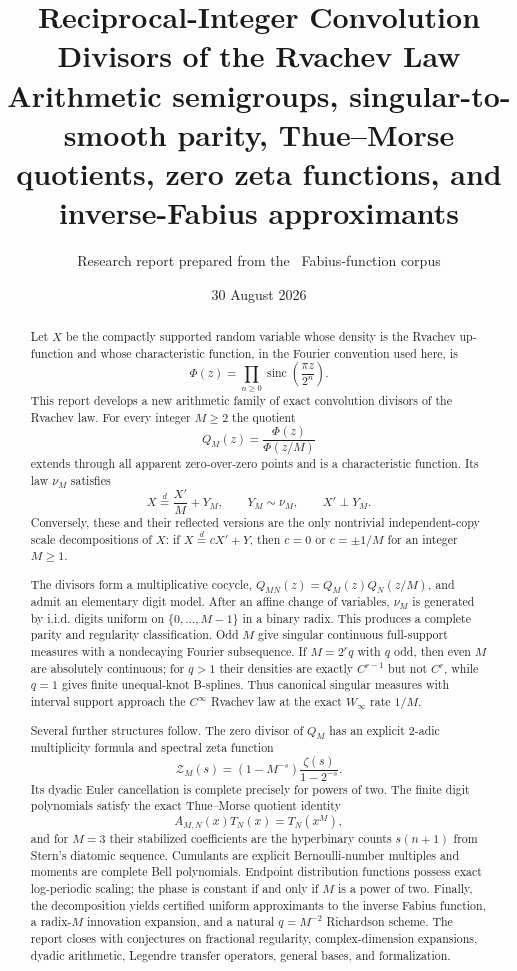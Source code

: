 \documentclass[11pt,oneside]{article}
\title{\bfseries Reciprocal-Integer Convolution Divisors of the Rvachev Law\\[0.35em]
\large Arithmetic semigroups, singular-to-smooth parity, Thue--Morse quotients, zero zeta functions, and inverse-Fabius approximants}
\author{Research report prepared from the \repo\ Fabius-function corpus}
\date{30 August 2026}
\theoremstyle{definition}
\theoremstyle{remark}
\newcommand{\sinc}{\operatorname{sinc}}
\numberwithin{equation}{section}
\newcommand{\1}{\mathbf 1}
\begin{document}
\maketitle

\begin{abstract}
Let $X$ be the compactly supported random variable whose density is the Rvachev
up-function and whose characteristic function, in the Fourier convention used here, is
\[
 \Phi(z)=\prod_{n\geq0}\sinc\!\left(\frac{\pi z}{2^n}\right).
\]
This report develops a new arithmetic family of exact convolution divisors of the
Rvachev law.  For every integer $M\geq2$ the quotient
\[
 Q_M(z)=\frac{\Phi(z)}{\Phi(z/M)}
\]
extends through all apparent zero-over-zero points and is a characteristic function.  Its
law $\nu_M$ satisfies
\[
 X\overset d=\frac{X'}{M}+Y_M,
 \qquad Y_M\sim\nu_M,
 \qquad X'\perp Y_M.
\]
Conversely, these and their reflected versions are the only nontrivial independent-copy
scale decompositions of $X$: if $X\overset d=cX'+Y$, then
$c=0$ or $c=\pm1/M$ for an integer $M\geq1$.

The divisors form a multiplicative cocycle,
$Q_{MN}(z)=Q_M(z)Q_N(z/M)$, and admit an elementary digit model.  After an affine
change of variables, $\nu_M$ is generated by i.i.d. digits uniform on
$\{0,\ldots,M-1\}$ in a binary radix.  This produces a complete parity and regularity
classification.  Odd $M$ give singular continuous full-support measures with a
nondecaying Fourier subsequence.  If $M=2^rq$ with $q$ odd, then even $M$ are
absolutely continuous; for $q>1$ their densities are exactly
$C^{r-1}$ but not $C^r$, while $q=1$ gives finite unequal-knot B-splines.
Thus canonical singular measures with interval support approach the $C^\infty$ Rvachev
law at the exact $W_\infty$ rate $1/M$.

Several further structures follow.  The zero divisor of $Q_M$ has an explicit
$2$-adic multiplicity formula and spectral zeta function
\[
 \mathcal Z_M(s)=(1-M^{-s})\frac{\zeta(s)}{1-2^{-s}}.
\]
Its dyadic Euler cancellation is complete precisely for powers of two.  The finite digit
polynomials satisfy the exact Thue--Morse quotient identity
\[
 A_{M,N}(x)T_N(x)=T_N(x^M),
\]
and for $M=3$ their stabilized coefficients are the hyperbinary counts
$s(n+1)$ from Stern's diatomic sequence.  Cumulants are explicit Bernoulli-number
multiples and moments are complete Bell polynomials.  Endpoint distribution functions
possess exact log-periodic scaling; the phase is constant if and only if $M$ is a power
of two.  Finally, the decomposition yields certified uniform approximants to the inverse
Fabius function, a radix-$M$ innovation expansion, and a natural $q=M^{-2}$ Richardson
scheme.  The report closes with conjectures on fractional regularity, complex-dimension
expansions, dyadic arithmetic, Legendre transfer operators, general bases, and formalization.
\end{abstract}
\end{document}
